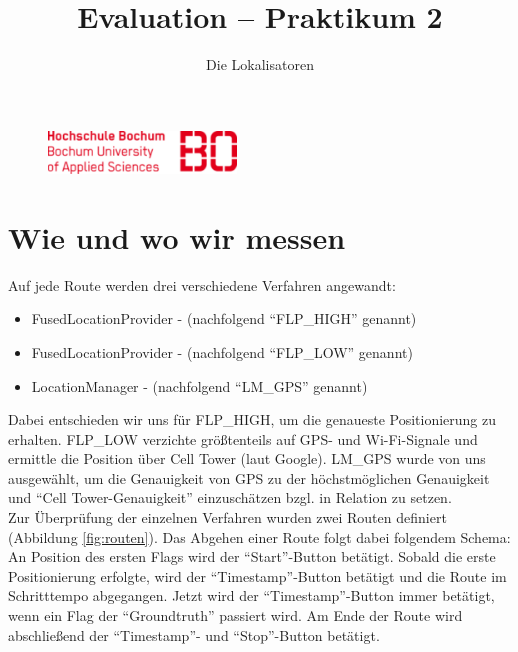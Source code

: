 

\title{Evaluation -- Praktikum 2}
\author{Die Lokalisatoren}

\ihead{}
\chead{}
\ohead{}
\ifoot{}
\cfoot{\pagemark}
\ofoot{}



\setlength{\parskip}{0em}
\setlength{\parindent}{0em}
\renewcommand{\baselinestretch}{1.5}



\begin{figure}[t]
	\flushright
	\includegraphics[width=5cm]{hs-bo-logo}
\end{figure}

\docheader

\section{Wie und wo wir messen}

Auf jede Route werden drei verschiedene Verfahren angewandt: 
\begin{itemize}
	\item FusedLocationProvider -  (nachfolgend "`FLP\_HIGH"' genannt)
	\item FusedLocationProvider -  (nachfolgend "`FLP\_LOW"' genannt)
	\item LocationManager -  (nachfolgend "`LM\_GPS"' genannt)
\end{itemize}

Dabei entschieden wir uns für FLP\_HIGH, um die genaueste Positionierung zu erhalten. FLP\_LOW verzichte größtenteils auf GPS- und Wi-Fi-Signale und ermittle die Position über Cell Tower (laut Google). LM\_GPS wurde von uns ausgewählt, um die Genauigkeit von GPS zu der höchstmöglichen Genauigkeit und "`Cell Tower-Genauigkeit"' einzuschätzen bzgl. in Relation zu setzen. \\

Zur Überprüfung der einzelnen Verfahren wurden zwei Routen definiert (Abbildung \ref{fig:routen}). Das Abgehen einer Route folgt dabei folgendem Schema: An Position des ersten Flags wird der "`Start"'-Button betätigt. Sobald die erste Positionierung erfolgte, wird der "`Timestamp"'-Button betätigt und die Route im Schritttempo abgegangen. Jetzt wird der "`Timestamp"'-Button immer betätigt, wenn ein Flag der "`Groundtruth"' passiert wird. Am Ende der Route wird abschließend der "`Timestamp"'- und "`Stop"'-Button betätigt.

